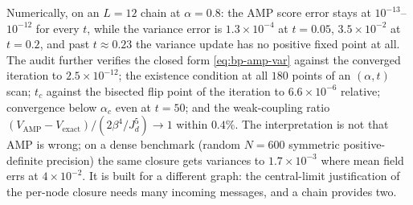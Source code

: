 Numerically, on an $L = 12$ chain at $\alpha = 0.8$: the AMP score error
stays at $10^{-13}$--$10^{-12}$ for every $t$, while the variance error
is $1.3 \times 10^{-4}$ at $t = 0.05$, $3.5 \times 10^{-2}$ at $t = 0.2$,
and past $t \approx 0.23$ the variance update has no positive fixed point
at all. The audit further verifies the closed form \eqref{eq:bp-amp-var}
against the converged iteration to $2.5 \times 10^{-12}$; the existence
condition at all $180$ points of an $(\alpha, t)$ scan; $t_c$ against the
bisected flip point of the iteration to $6.6 \times 10^{-6}$ relative;
convergence below $\alpha_c$ even at $t = 50$; and the weak-coupling
ratio $(V_{\mathrm{AMP}} - V_{\mathrm{exact}})/(2\beta^4/J_d^5) \to 1$
within $0.4\%$. The interpretation is not that AMP is wrong; on a dense
benchmark (random $N = 600$ symmetric positive-definite precision) the
same closure gets variances to $1.7 \times 10^{-3}$ where mean field errs
at $4 \times 10^{-2}$. It is built for a different graph: the
central-limit justification of the per-node closure needs many incoming
messages, and a chain provides two.
